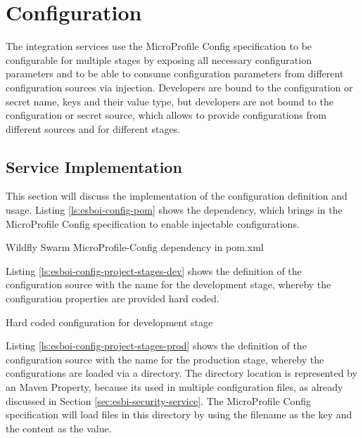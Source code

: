\section{Configuration}
\label{sec:esbi-configuration}
The integration services use the MicroProfile Config specification to be configurable for multiple stages by exposing all necessary configuration parameters and to be able to consume configuration parameters from different configuration sources via injection. Developers are bound to the configuration or secret name, keys and their value type, but developers are not bound to the configuration or secret source, which allows to provide configurations from different sources and for different stages. 

\subsection{Service Implementation}
\label{sec:esbi-config-service}
This section will discuss the implementation of the configuration definition and usage. Listing \vref{ls:esboi-config-pom} shows the dependency, which brings in the MicroProfile Config specification to enable injectable configurations.
 
\begin{listing}
	\caption{Wildfly Swarm MicroProfile-Config dependency in pom.xml}
	\label{ls:esboi-config-pom}
\end{listing}

Listing \vref{ls:esboi-config-project-stages-dev} shows the definition of the configuration source with the name  for the development stage, whereby the configuration properties are provided hard coded.

\begin{listing}
	\caption{Hard coded configuration for development stage}
	\label{ls:esboi-config-project-stages-dev}
\end{listing}

Listing \vref{ls:esboi-config-project-stages-prod} shows the definition of the configuration source with the name  for the production stage, whereby the configurations are loaded via a directory. The directory location is represented by an Maven Property, because its used in multiple configuration files, as already discussed in Section \vref{sec:esbi-security-service}. The MicroProfile Config specification will load files in this directory by using the filename as the key and the content as the value.

